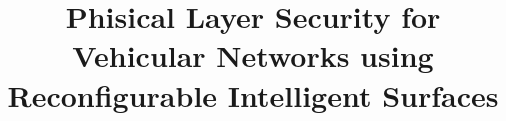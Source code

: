 \documentclass[conference]{IEEEtran}
\begin{document}
\title{Phisical Layer Security for Vehicular Networks using Reconfigurable Intelligent Surfaces}


\author{
}

\maketitle



\IEEEpeerreviewmaketitle





\end{document}
